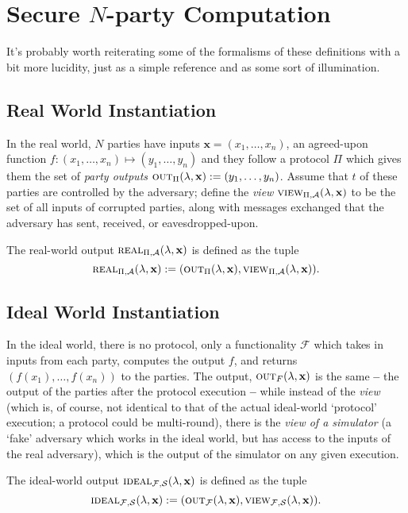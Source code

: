 \section{Secure $N$-party Computation}

It's probably worth reiterating some of the formalisms of these definitions with a bit more lucidity, just as a simple reference and as some sort of illumination.

\subsection{Real World Instantiation} In the real world, $N$ parties have inputs $\mathbf{x}=(x_1,\dots,x_n)$, an agreed-upon function $f:(x_1,\dots,x_n)\mapsto(y_1,\dots,y_n)$ and they follow a protocol $\Pi$ which gives them the set of \textit{party outputs} $\textsc{out}_{\Pi}(\lambda,\mathbf{x}):=(y_1,\dots, y_n)$. Assume that $t$ of these parties are controlled by the adversary; define the \textit{view} $\textsc{view}_{\Pi,\mathcal{A}}(\lambda, \mathbf{x})$ to be the set of all inputs of corrupted parties, along with messages exchanged that the adversary has sent, received, or eavesdropped-upon.

\begin{definition} The \rarrow real-world output $\textsc{real}_{\Pi,\mathcal{A}}(\lambda,\mathbf{x})$ is defined as the tuple
	$$\textsc{real}_{\Pi,\mathcal{A}}(\lambda,\mathbf{x}):=(\textsc{out}_{\Pi}(\lambda,\mathbf{x}),\textsc{view}_{\Pi,\mathcal{A}}(\lambda, \mathbf{x})).$$	
\end{definition}

\subsection{Ideal World Instantiation} In the ideal world, there is no protocol, only a functionality $\mathcal{F}$ which takes in inputs from each party, computes the output $f$, and returns $(f(x_1),\dots,f(x_n))$ to the parties. The output, $\textsc{out}_{F}(\lambda,\mathbf{x})$ is the same \textbf{--} the output of the parties after the protocol execution \textbf{--} while instead of the \textit{view} (which is, of course, not identical to that of the actual ideal-world `protocol' execution; a protocol could be multi-round), there is the \textit{view of a simulator} (a `fake' adversary which works in the ideal world, but has access to the inputs of the real adversary), which is the output of the simulator on any given execution. 

\begin{definition} The \rarrow ideal-world output $\textsc{ideal}_{\mathcal{F},\mathcal{S}}(\lambda,\mathbf{x})$ is defined as the tuple
$$\textsc{ideal}_{\mathcal{F},\mathcal{S}}(\lambda,\mathbf{x}):=(\textsc{out}_{\mathcal{F}}(\lambda,\mathbf{x}),\textsc{view}_{\mathcal{F},\mathcal{S}}(\lambda, \mathbf{x})).$$	
\end{definition}

